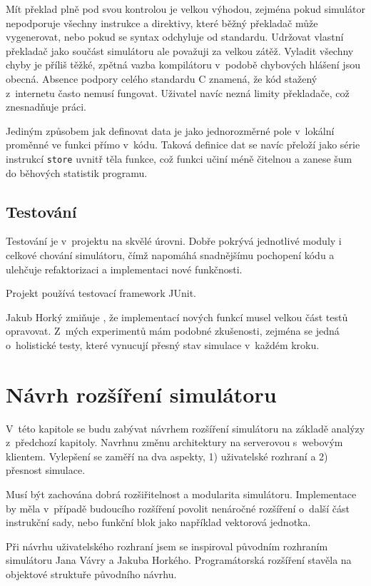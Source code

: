 Mít překlad plně pod svou kontrolou je velkou výhodou, zejména pokud simulátor nepodporuje všechny instrukce a direktivy, které běžný překladač může vygenerovat, nebo pokud se syntax odchyluje od standardu.
Udržovat vlastní překladač jako součást simulátoru ale považuji za velkou zátěž.
Vyladit všechny chyby je příliš těžké, zpětná vazba kompilátoru v~podobě chybových hlášení jsou obecná.
Absence podpory celého standardu C znamená, že kód stažený z~internetu často nemusí fungovat.
Uživatel navíc nezná limity překladače, což znesnadňuje práci.

Jediným způsobem jak definovat data je jako jednorozměrné pole v~lokální proměnné ve funkci přímo v~kódu.
Taková definice dat se navíc přeloží jako série instrukcí \texttt{store} uvnitř těla funkce, což funkci učiní méně čitelnou a zanese šum do běhových statistik programu.

\section{Testování}

Testování je v~projektu na skvělé úrovni.
Dobře pokrývá jednotlivé moduly i celkové chování simulátoru, čímž napomáhá snadnějšímu pochopení kódu a ulehčuje refaktorizaci a implementaci nové funkčnosti.

Projekt používá testovací framework JUnit. %

Jakub Horký zmiňuje \cite{horkySim}, že implementací nových funkcí musel velkou část testů opravovat.
Z~mých experimentů mám podobné zkušenosti, zejména se jedná o~holistické testy, které vynucují přesný stav simulace v~každém kroku. 

\chapter{Návrh rozšíření simulátoru}
\label{navrhrozsirenisimulatoru}

V~této kapitole se budu zabývat návrhem rozšíření simulátoru na základě analýzy z~předchozí kapitoly.
Navrhnu změnu architektury na serverovou s~webovým klientem.
Vylepšení se zaměří na dva aspekty, 1) uživatelské rozhraní a 2) přesnost simulace.

Musí být zachována dobrá rozšiřitelnost a modularita simulátoru.
Implementace by měla v~případě budoucího rozšíření povolit nenáročné rozšíření o~další část instrukční sady, nebo funkční blok jako například vektorová jednotka.

Při návrhu uživatelského rozhraní jsem se inspiroval původním rozhraním simulátoru Jana Vávry a Jakuba Horkého.
Programátorská rozšíření stavěla na objektové struktuře původního návrhu.

